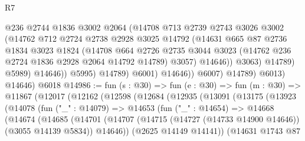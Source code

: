 \begin{lexlean}{R7}
\begin{coremodule}
                              @236
                              @2744
                              @1836
                              @3002
                              @2064
                              (@14708
                                @713
                                @2739
                                @2743
                                @3026
                                @3002
                                (@14762
                                  @712
                                  @2724
                                  @2738
                                  @2928
                                  @3025
                                  @14792
                                  (@14631
                                    @665
                                    @87
                                    @2736
                                    @1834
                                    @3023
                                    @1824
                                    (@14708
                                      @664
                                      @2726
                                      @2735
                                      @3044
                                      @3023
                                      (@14762 @236 @2724 @1836 @2928 @2064 @14792 @14789)
                                      @3057)
                                    @14646))
                                @3063)
                              @14789)
                            @5989)
                          @14646))
                      @5995)
                    @14789)
                  @6001)
                @14646))
            @6007)
          @14789)
        @6013)
      @14646)
    @6018
@14986 := fun (s : @30) =>
  fun (e : @30) =>
  fun (m : @30) =>
  @11867
    (@12017
      (@12162
        (@12598
          (@12684
            (@12935
              (@13091
                (@13175
                  (@13923
                    (@14078
                      (fun ("_" : @14079) =>
                      @14653
                        (fun ("_" : @14654) =>
                        @14668
                          (@14674
                            (@14685
                              (@14701
                                (@14707
                                  (@14715 (@14727 (@14733 @14900 @14646)) (@3055 @14139 @5834))
                                  @14646))
                              (@2625 @14149 @14141))
                            (@14631
                              @1743
                              @87

\end{coremodule}
\end{lexlean}
